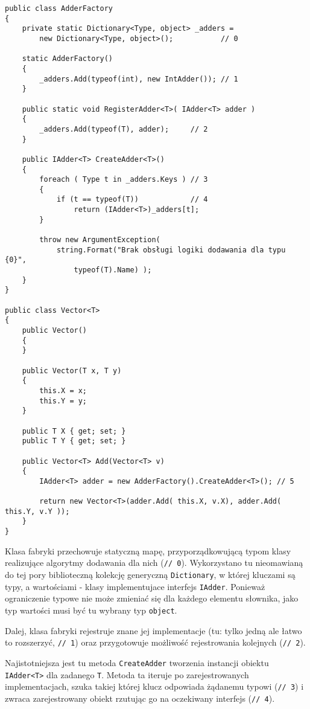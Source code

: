 \begin{scriptsize}
\begin{verbatim}
public class AdderFactory
{
    private static Dictionary<Type, object> _adders = 
        new Dictionary<Type, object>();           // 0

    static AdderFactory()
    {
        _adders.Add(typeof(int), new IntAdder()); // 1
    }

    public static void RegisterAdder<T>( IAdder<T> adder )
    {
        _adders.Add(typeof(T), adder);     // 2
    }

    public IAdder<T> CreateAdder<T>()
    {
        foreach ( Type t in _adders.Keys ) // 3
        {
            if (t == typeof(T))            // 4
                return (IAdder<T>)_adders[t];
        }

        throw new ArgumentException(
            string.Format("Brak obsługi logiki dodawania dla typu {0}",
                typeof(T).Name) );
    }
}

public class Vector<T>
{
    public Vector()
    {
    }

    public Vector(T x, T y)
    {
        this.X = x;
        this.Y = y;
    }

    public T X { get; set; }
    public T Y { get; set; }

    public Vector<T> Add(Vector<T> v)
    {
        IAdder<T> adder = new AdderFactory().CreateAdder<T>(); // 5

        return new Vector<T>(adder.Add( this.X, v.X), adder.Add( this.Y, v.Y ));
    }
}
\end{verbatim}
\end{scriptsize}

Klasa fabryki przechowuje statyczną mapę, przyporządkowującą typom klasy realizujące algorytmy dodawania
dla nich ({\tt // 0}). Wykorzystano tu nieomawianą do tej pory biblioteczną kolekcję generyczną {\tt Dictionary},
w której kluczami są typy, a wartościami - klasy implementujace interfejs {\tt IAdder}. Ponieważ ograniczenie typowe
nie może zmieniać się dla każdego elementu słownika, jako typ wartości musi być tu wybrany typ {\tt object}.

Dalej, klasa fabryki rejestruje znane jej implementacje (tu: tylko jedną ale łatwo to rozszerzyć, {\tt // 1}) oraz
przygotowuje możliwość rejestrowania kolejnych ({\tt // 2}). 

Najistotniejsza jest tu metoda {\tt CreateAdder} tworzenia instancji obiektu {\tt IAdder<T>} dla zadanego {\tt T}.
Metoda ta iteruje po zarejestrowanych implementacjach, szuka takiej której klucz odpowiada żądanemu typowi ({\tt // 3}) i 
zwraca zarejestrowany obiekt rzutując go na oczekiwany interfejs ({\tt // 4}).

